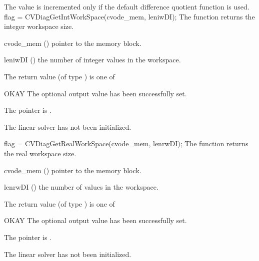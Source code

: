 {
  The value  is incremented only if the default 
   difference quotient function is used.
}
%
%
{
  flag = CVDiagGetIntWorkSpace(cvode\_mem, leniwDI);
}
{
  The function  returns the
  {\cvdiag} integer workspace size.
}
{
  \begin{args}
  \item[cvode\_mem] ()
    pointer to the {\cvode} memory block.
  \item[leniwDI] ()
    the number of integer values in the {\cvdiag} workspace.
  \end{args}
}
{
  The return value  (of type ) is one of
  \begin{args}
  \item[OKAY] 
    The optional output value has been successfully set.
  \item[\Id{LIN\_NO\_MEM}]
    The  pointer is .
  \item[\Id{LIN\_NO\_LMEM}]
    The {\cvdiag} linear solver has not been initialized.
  \end{args}
}
{}
{
  flag = CVDiagGetRealWorkSpace(cvode\_mem, lenrwDI);
}
{
  The function  returns the
  {\cvdiag} real workspace size.
}
{
  \begin{args}
  \item[cvode\_mem] ()
    pointer to the {\cvode} memory block.
  \item[lenrwDI] ()
    the number of  values in the {\cvdiag} workspace.
  \end{args}
}
{
  The return value  (of type ) is one of
  \begin{args}
  \item[OKAY] 
    The optional output value has been successfully set.
  \item[\Id{LIN\_NO\_MEM}]
    The  pointer is .
  \item[\Id{LIN\_NO\_LMEM}]
    The {\cvdiag} linear solver has not been initialized.
  \end{args}
}
